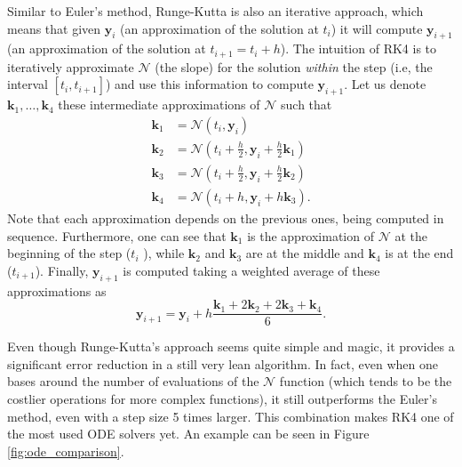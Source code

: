 Similar to Euler's method, Runge-Kutta is also an iterative approach, which means that given $\bm{y}_i$ (an approximation of the solution at $t_i$) it will compute $\bm{y}_{i+1}$ (an approximation of the solution at $t_{i+1}=t_i + h$).
The intuition of RK4 is to iteratively approximate $\mathcal{N}$ (the slope) for the solution \emph{within} the step (i.e, the interval $\left[ t_i,t_{i+1} \right] $) and use this information to compute $\bm{y}_{i+1}$.
Let us denote $\bm{k}_1,\ldots,\bm{k}_4$ these intermediate approximations of $\mathcal{N}$ such that
\begin{align*}
    \bm{k}_1 &= \mathcal{N}\left( t_i , \bm{y}_i \right)  \\
    \bm{k}_2 &= \mathcal{N}\left( t_i+\frac{h}{2}, \bm{y}_i + \frac{h}{2}\bm{k}_1 \right)  \\
    \bm{k}_3 &= \mathcal{N}\left( t_i+\frac{h}{2}, \bm{y}_i + \frac{h}{2}\bm{k}_2 \right)  \\
    \bm{k}_4 &= \mathcal{N}\left( t_i+h, \bm{y}_i + h \bm{k}_3 \right)
.\end{align*}
Note that each approximation depends on the previous ones, being computed in sequence.
Furthermore, one can see that $\bm{k}_1$ is the approximation of $\mathcal{N}$ at the beginning of the step ($t_i$ ), while $\bm{k}_2$ and $\bm{k}_3$ are at the middle and $\bm{k}_4$ is at the end ($t_{i+1}$).
Finally, $\bm{y}_{i+1}$ is computed taking a weighted average of these approximations as \[
    \bm{y}_{i+1} = \bm{y}_i + h \frac{\bm{k}_1 + 2\bm{k}_2 + 2 \bm{k}_3 + \bm{k}_4}{6}
.\]

Even though Runge-Kutta's approach seems quite simple and magic, it provides a significant error reduction in a still very lean algorithm.
In fact, even when one bases around the number of evaluations of the $\mathcal{N}$ function (which tends to be the costlier operations for more complex functions), it still outperforms the Euler's method, even with a step size 5 times larger\footnotemark.
This combination makes RK4 one of the most used ODE solvers yet.
An example can be seen in Figure \ref{fig:ode_comparison}.

